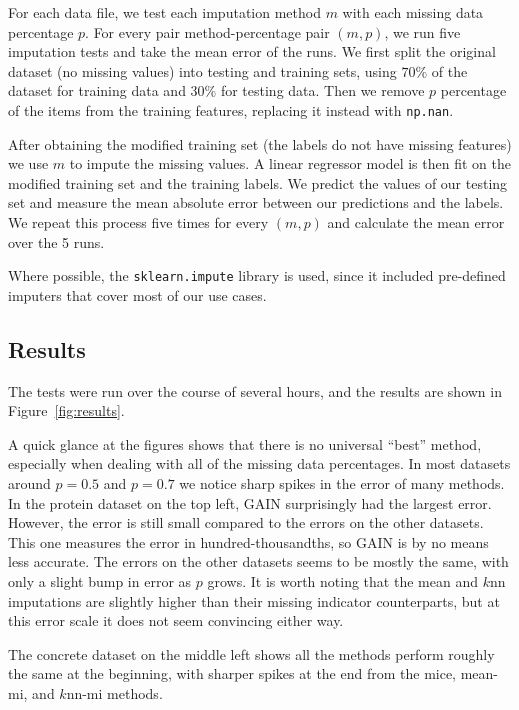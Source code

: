 \documentclass[12pt]{article}
\begin{document}
For each data file, we test each imputation method $m$ with each missing data 
percentage $p$.
For every pair method-percentage pair $(m, p)$, we run five imputation tests and 
take the mean error of the runs.
We first split the original dataset (no missing values) into testing and training 
sets, using $70\%$ of the dataset for training data and $30\%$ for testing data.
Then we remove $p$ percentage of the items from the training features, replacing
it instead with \texttt{np.nan}.

After obtaining the modified training set (the labels do not have missing features)
we use $m$ to impute the missing values.
A linear regressor model is then fit on the modified training set and the training labels.
We predict the values of our testing set and measure the mean absolute error between our 
predictions and the labels.
We repeat this process five times for every $(m, p)$ and calculate the 
mean error over the 5 runs.

Where possible, the \texttt{sklearn.impute} library is used, since it included pre-defined
imputers that cover most of our use cases.
\subsection{Results}
The tests were run over the course of several hours, and the results are
shown in Figure~\ref{fig:results}.

A quick glance at the figures shows that there is no universal ``best'' 
method, especially when dealing with all of the missing data percentages.
In most datasets around $p=0.5$ and $p=0.7$ we notice sharp spikes 
in the error of many methods.
In the protein dataset on the top left, GAIN surprisingly had the largest error.
However, the error is still small compared to the errors on the other 
datasets.
This one measures the error in hundred-thousandths, so GAIN is by no means
less accurate.
The errors on the other datasets seems to be mostly the same, with only a 
slight bump in error as $p$ grows.
It is worth noting that the mean and $k$nn imputations are slightly 
higher than their missing indicator counterparts, but at this error scale 
it does not seem convincing either way.

The concrete dataset on the middle left shows all the methods perform 
roughly the same at the beginning, with sharper spikes at the end 
from the mice, mean-mi, and $k$nn-mi methods.
\end{document}
